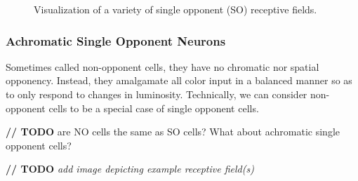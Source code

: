 \documentclass[journal,onecolumn]{IEEEtran}
\begin{document}
\begin{figure}[H]
    \caption{Visualization of a variety of single opponent (SO) receptive fields.}
    \label{fig:rf-so}
\end{figure}

\subsubsection*{Achromatic Single Opponent Neurons}

Sometimes called non-opponent cells, they have no chromatic nor spatial opponency. Instead, they amalgamate all color input in a balanced manner so as to only respond to changes in luminosity. Technically, we can consider non-opponent cells to be a special case of single opponent cells.

\textbf{// TODO} are NO cells the same as SO cells? What about achromatic single opponent cells?

\textbf{// TODO} \textit{add image depicting example receptive field(s)}
\end{document}
